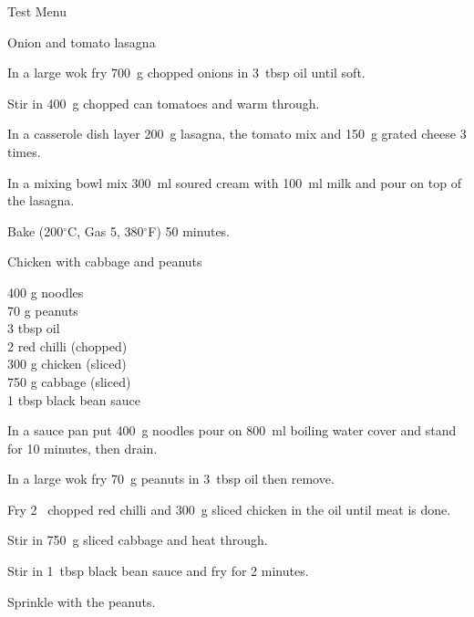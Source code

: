 \begin{menu}{Test Menu}
\begin{recipe}{2}{Onion and tomato lasagna}
\begin{ingredients}
		\end{ingredients}
	
	
    \begin{instructions}
    \item 
        In a large wok fry
        700~g chopped onions
        in
        3~tbsp  oil
        until soft.
      \item 
        Stir in 400~g chopped can tomatoes
        and warm through.
      \item 
        In a casserole dish layer
        200~g  lasagna,
        the tomato mix and
        150~g grated cheese
        3 times.
      \item 
        In a mixing bowl mix
        300~ml  soured cream
        with
        100~ml  milk
        and pour on top of the lasagna.
      \item 
        Bake 
      (200$^{\circ}$C, Gas 5, 380$^{\circ}$F)
     50 minutes.
      
    \end{instructions}
    \end{recipe}%
  
    \begin{recipe}{2}{Chicken with cabbage and peanuts}%
    
		\begin{ingredients}
		400 g noodles  \\
	70 g peanuts  \\
	3 tbsp oil  \\
	2  red chilli (chopped) \\
	300 g chicken (sliced) \\
	750 g cabbage (sliced) \\
	1 tbsp black bean sauce  \\
	
		\end{ingredients}
	
    \begin{instructions}
    \item 
      In a sauce pan
      put
      400~g  noodles
      pour on
      800~ml  boiling water
      cover and stand for 10 minutes, then drain.
    \item 
        In a large wok	fry
        70~g  peanuts
        in
        3~tbsp  oil
        then remove.
      \item 
        Fry 2~ chopped red chilli
        and
        300~g sliced chicken
        in the oil until meat is done.
      \item 
        Stir in
        750~g sliced cabbage
        and heat through.
      \item 
        Stir in
        1~tbsp  black bean sauce
        and fry for 2 minutes.
      \item 
        Sprinkle with the peanuts.
      

\end{instructions}
\end{recipe}
\end{menu}

